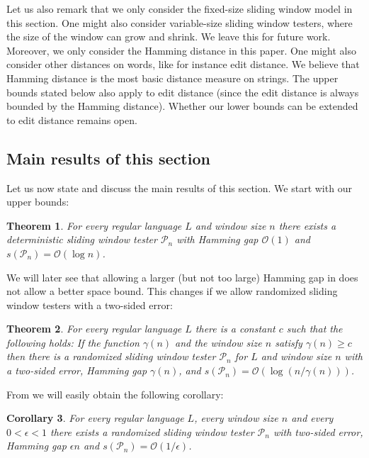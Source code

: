 \documentclass{article}\usepackage[a4paper,margin=20mm]{geometry}
\newtheorem{theorem}{Theorem}\newtheorem{lemma}[theorem]{Lemma}\newtheorem{proposition}[theorem]{Proposition}\newtheorem{corollary}[theorem]{Corollary}\newtheorem{definition}[theorem]{Definition}\newtheorem{claim}[theorem]{Claim}\newtheorem{remark}[theorem]{Remark}\newtheorem{observation}[theorem]{Observation}\newtheorem{conjecture}[theorem]{Conjecture}\newtheorem{example}[theorem]{Example}
\renewcommand{\O}{\mathcal{O}}
\renewcommand{\P}{\mathcal{P}}
\renewcommand{\geq}{\geqslant}
\renewcommand{\ge}{\geq}
\begin{document}
Let us also remark that we only consider the fixed-size sliding window model in this section. One might also consider
variable-size sliding window testers, where the size of the window can grow and shrink. 
We leave this for future work. Moreover, we only consider the Hamming distance in this paper.
One might also consider other distances on words, like for instance edit distance. We believe
that Hamming distance is the most basic distance measure on strings. The upper bounds stated below also apply
to edit distance (since the edit distance is always bounded by the Hamming distance). Whether our 
lower bounds can be extended to edit distance remains open.

\subsection{Main results of this section} \label{sec main results testing}

Let us now state and discuss the main results of this section. We start with our upper bounds:

\begin{theorem}
\label{theorem:deterministic_ub}
For every regular language $L$ and window size $n$ there exists a deterministic sliding window tester $\P_n$ 
with Hamming gap $\O(1)$ and $s(\P_n) = \O(\log n)$.
\end{theorem}
We will later see that allowing a larger (but not too large) Hamming gap in  does not allow a better space bound.
This changes if we allow randomized sliding window testers with a two-sided error:

\begin{theorem}
\label{theorem:two-sided-general-HG}
For every regular language $L$ there is a constant $c$ such that the following holds:
If the function $\gamma(n)$ and the window size $n$ satisfy $\gamma(n) \ge c$ then there is a randomized sliding window tester $\P_n$ for $L$ and window size $n$ with a two-sided error,
Hamming gap $\gamma(n)$, and $s(\P_n) = \O(\log(n/\gamma(n)))$.
\end{theorem}
From  we will easily obtain the following corollary:
\begin{corollary}
\label{theorem:two-sided}
For every regular language $L$, every window size $n$ and every $0 < \epsilon < 1$
there exists a randomized sliding window tester $\P_n$
with two-sided error, Hamming gap $\epsilon n$ and $s(\P_n) = \O(1/\epsilon)$.
\end{corollary}
\end{document}
